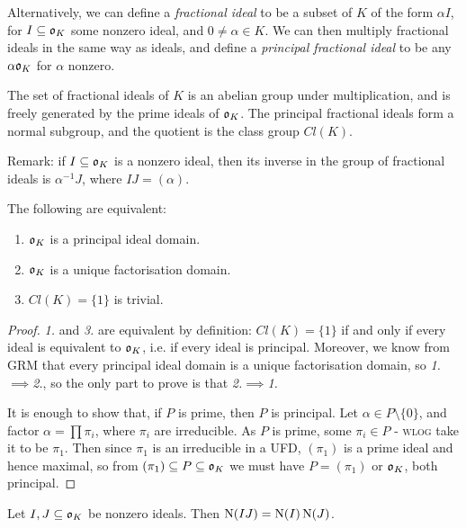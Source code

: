 \documentclass[10pt,a4paper]{article}
\begin{document}
Alternatively, we can define a \emph{fractional ideal} to be a subset of $K$ of the form $\alpha I$, for $I \subseteq \mathfrak{o}_K$ some nonzero ideal, and $0 \neq \alpha \in K$. We can then multiply fractional ideals in the same way as ideals, and define a \emph{principal fractional ideal} to be any $\alpha\mathfrak{o}_K$ for $\alpha$ nonzero.

\begin{theorem}
The set of fractional ideals of $K$ is an abelian group under multiplication, and is freely generated by the prime ideals of $\mathfrak{o}_K$. The principal fractional ideals form a normal subgroup, and the quotient is the class group $Cl(K)$.
\end{theorem}
Remark: if $I \subseteq \mathfrak{o}_K$ is a nonzero ideal, then its inverse in the group of fractional ideals is $\alpha^{-1}J$, where $IJ = (\alpha)$.
\begin{proposition}
The following are equivalent:
\begin{enumerate}
\item $\mathfrak{o}_K$ is a principal ideal domain.
\item $\mathfrak{o}_K$ is a unique factorisation domain.
\item $Cl(K) = \{1\}$ is trivial.
\end{enumerate}
\end{proposition}
\begin{proof}
\textit{1.} and \textit{3.} are equivalent by definition: $Cl(K) = \{1\}$ if and only if every ideal is equivalent to $\mathfrak{o}_K$, i.e. if every ideal is principal. Moreover, we know from GRM that every principal ideal domain is a unique factorisation domain, so \textit{1.}$\implies$\textit{2.}, so the only part to prove is that \textit{2.}$\implies$\textit{1.}

It is enough to show that, if $P$ is prime, then $P$ is principal. Let $\alpha \in P\setminus\{0\}$, and factor $\alpha = \prod \pi_i$, where $\pi_i$ are irreducible. As $P$ is prime, some $\pi_i \in P$ - \textsc{wlog} take it to be $\pi_1$. Then since $\pi_1$ is an irreducible in a UFD, $(\pi_1)$ is a prime ideal and hence maximal, so from $(\pi_1) \subseteq P \subseteq \mathfrak{o}_K$ we must have $P = (\pi_1)$ or $\mathfrak{o}_K$, both principal.
\end{proof}
\begin{theorem}
Let $I, J \subseteq \mathfrak{o}_K$ be nonzero ideals. Then $\operatorname{N}(IJ) = \operatorname{N}(I)\operatorname{N}(J)$.
\end{theorem}
\end{document}
